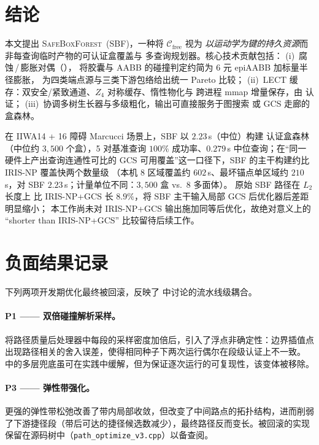 \documentclass[journal]{IEEEtran}
\newcommand{\Cfree}{\mathcal{C}_{\mathrm{free}}}
\begin{document}
\section{结论}\label{sec:conclusion}

本文提出 \textsc{SafeBoxForest}~(SBF)，一种将 $\Cfree$ 视为
\emph{以运动学为键的持久资源}而非每查询临时产物的可认证盒覆盖与
多查询规划器。核心技术贡献包括：
(i)~腐蚀\,/\,膨胀对偶（），
将胶囊与 AABB 的碰撞判定约简为 6 元 epiAABB 加标量半径膨胀，
为四类端点源与三类下游包络给出统一 Pareto 比较；
(ii)~LECT 缓存：双安全/紧致通道、$Z_4$ 对称缓存、惰性物化与
跨进程 mmap 增量保存，由  认证；
(iii)~协调多树生长器与多级粗化，输出可直接服务于图搜索
或 GCS 走廊的盒森林。

在 IIWA14 + 16 障碍 Marcucci 场景上，SBF 以 $2.23$\,s（中位）构建
认证盒森林（中位约 $3{,}500$ 个盒），5 对基准查询 $100\%$ 成功率、$0.279$\,s
中位查询；在“同一硬件上产出查询连通性可比的 GCS 可用覆盖”这一口径下，SBF 的主干构建约比 IRIS-NP 覆盖快两个数量级
（本机 8 区域覆盖约 $602$\,s、最坏锚点单区域约 $210$\,s，对 SBF $2.23$\,s；计量单位不同：$3{,}500$ 盒 vs.\ $8$ 多面体）。
原始 SBF 路径在 $L_2$ 长度上
比 IRIS-NP+GCS 长 $8.9\%$，将 SBF 主干输入局部 GCS 后优化器后差距明显缩小；
本工作尚未对 IRIS-NP+GCS 输出施加同等后优化，故绝对意义上的
``shorter than IRIS-NP+GCS'' 比较留待后续工作。

\appendix

\section{负面结果记录}\label{app:negative_results}

下列两项开发期优化最终被回滚，反映了  中讨论的流水线级耦合。

\paragraph{P1 —— 双倍碰撞解析采样。}
将路径质量后处理器中每段的采样密度加倍后，引入了浮点非确定性：边界插值点出现路径相关的舍入误差，使得相同种子下两次运行偶尔在段级认证上不一致。 中的多层兜底虽可在实践中缓解，但为保证逐次运行的可复现性，该变体被移除。

\paragraph{P3 —— 弹性带强化。}
更强的弹性带松弛改善了带内局部收敛，但改变了中间路点的拓扑结构，进而削弱了下游捷径段（带后可达的捷径候选数减少），最终路径反而变长。被回滚的实现保留在源码树中（\texttt{path\_optimize\_v3.cpp}）以备查阅。
\end{document}
